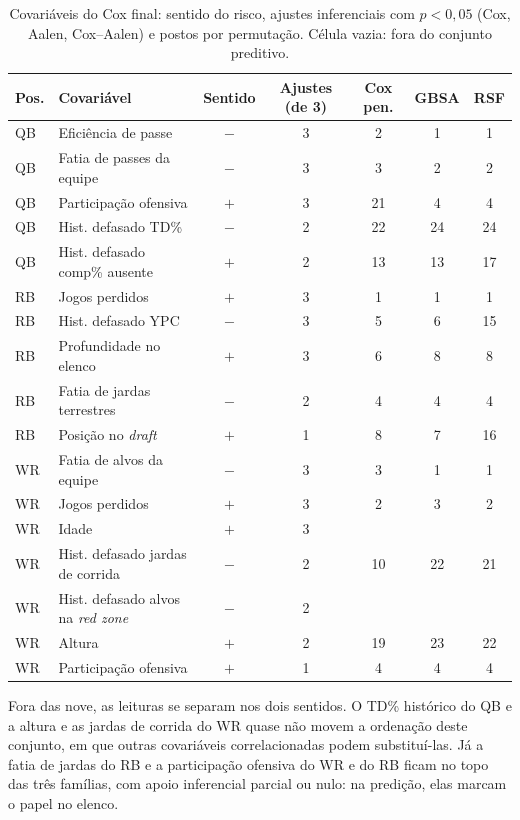\begin{table}[H]
\centering
\caption{Covariáveis do Cox final: sentido do risco, ajustes inferenciais com $p<0{,}05$ (Cox, Aalen, Cox--Aalen) e postos por permutação. Célula vazia: fora do conjunto preditivo.}
\label{tab:leituras_cruzadas}
\thesistablesetup
\footnotesize\setlength{\tabcolsep}{3pt}
\begin{tabular*}{\textwidth}{@{\extracolsep{\fill}}llccccc@{}}
\toprule
\textbf{Pos.} & \textbf{Covariável} & \textbf{Sentido} & \textbf{Ajustes (de 3)} & \textbf{Cox pen.} & \textbf{GBSA} & \textbf{RSF} \\
\midrule
QB & Eficiência de passe & $-$ & 3 & 2 & 1 & 1 \\
QB & Fatia de passes da equipe & $-$ & 3 & 3 & 2 & 2 \\
QB & Participação ofensiva & $+$ & 3 & 21 & 4 & 4 \\
QB & Hist. defasado TD\% & $-$ & 2 & 22 & 24 & 24 \\
QB & Hist. defasado comp\% ausente & $+$ & 2 & 13 & 13 & 17 \\
\midrule
RB & Jogos perdidos & $+$ & 3 & 1 & 1 & 1 \\
RB & Hist. defasado YPC & $-$ & 3 & 5 & 6 & 15 \\
RB & Profundidade no elenco & $+$ & 3 & 6 & 8 & 8 \\
RB & Fatia de jardas terrestres & $-$ & 2 & 4 & 4 & 4 \\
RB & Posição no \textit{draft} & $+$ & 1 & 8 & 7 & 16 \\
\midrule
WR & Fatia de alvos da equipe & $-$ & 3 & 3 & 1 & 1 \\
WR & Jogos perdidos & $+$ & 3 & 2 & 3 & 2 \\
WR & Idade & $+$ & 3 & & & \\
WR & Hist. defasado jardas de corrida & $-$ & 2 & 10 & 22 & 21 \\
WR & Hist. defasado alvos na \textit{red zone} & $-$ & 2 & & & \\
WR & Altura & $+$ & 2 & 19 & 23 & 22 \\
WR & Participação ofensiva & $+$ & 1 & 4 & 4 & 4 \\
\bottomrule
\end{tabular*}
\end{table}

Fora das nove, as leituras se separam nos dois sentidos. O TD\% histórico do QB e a altura e as jardas de corrida do WR quase não movem a ordenação deste conjunto, em que outras covariáveis correlacionadas podem substituí-las. Já a fatia de jardas do RB e a participação ofensiva do WR e do RB ficam no topo das três famílias, com apoio inferencial parcial ou nulo: na predição, elas marcam o papel no elenco.

